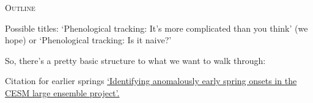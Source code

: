 \documentclass[11pt,letterpaper]{article}
\renewcommand{\section}[1]{%
\bigskip
\begin{center}
\begin{Large}
\normalfont\scshape #1
\medskip
\end{Large}
\end{center}}
\begin{document}
\section{Outline}

\noindent Possible titles: `Phenological tracking: It's more complicated than you think' (we hope) or `Phenological tracking: Is it naive?'

So, there's a pretty basic structure to what we want to walk through:



\noindent Citation for earlier springs \href{https://link.springer.com/article/10.1007/s00382-016-3313-2}{`Identifying anomalously early spring onsets in the CESM large ensemble project'.}
\end{document}
